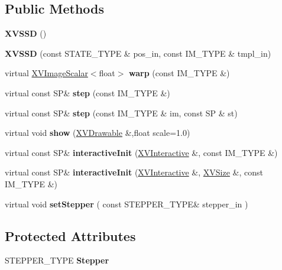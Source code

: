\subsection*{Public Methods}
\begin{CompactItemize}
\item 
{\bf XVSSD} ()
\item 
{\bf XVSSD} (const STATE\_\-TYPE \& pos\_\-in, const IM\_\-TYPE \& tmpl\_\-in)
\item 
\label{XVSSD_a2}
\hypertarget{class_XVSSD_a2}{
virtual \hyperlink{class_XVImageScalar}{XVImage\-Scalar}$<$float$>$ {\bf warp} (const IM\_\-TYPE \&)}

\item 
\label{XVSSD_a3}
\hypertarget{class_XVSSD_a3}{
virtual const SP\& {\bf step} (const IM\_\-TYPE \&)}

\item 
virtual const SP\& {\bf step} (const IM\_\-TYPE \& im, const SP \& st)
\item 
\label{XVSSD_a5}
\hypertarget{class_XVSSD_a5}{
virtual void {\bf show} (\hyperlink{class_XVDrawable}{XVDrawable} \&,float scale=1.0)}

\item 
\label{XVSSD_a6}
\hypertarget{class_XVSSD_a6}{
virtual const SP\& {\bf interactive\-Init} (\hyperlink{class_XVInteractive}{XVInteractive} \&, const IM\_\-TYPE \&)}

\item 
\label{XVSSD_a7}
\hypertarget{class_XVSSD_a7}{
virtual const SP\& {\bf interactive\-Init} (\hyperlink{class_XVInteractive}{XVInteractive} \&, \hyperlink{class_XVSize}{XVSize} \&, const IM\_\-TYPE \&)}

\item 
\label{XVSSD_a8}
\hypertarget{class_XVSSD_a8}{
virtual void {\bf set\-Stepper} ( const STEPPER\_\-TYPE\& stepper\_\-in )}

\end{CompactItemize}
\subsection*{Protected Attributes}
\begin{CompactItemize}
\item 
STEPPER\_\-TYPE {\bf Stepper}
\end{CompactItemize}


